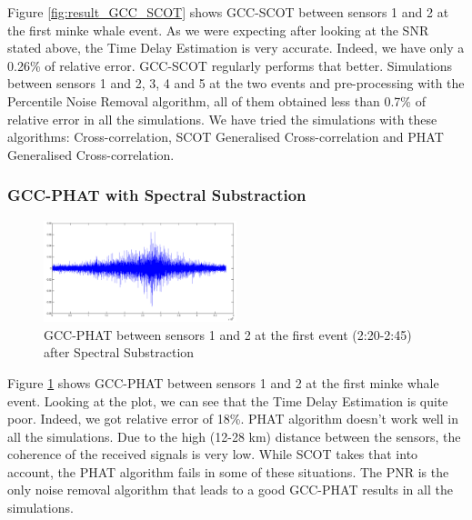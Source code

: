       Figure \ref{fig:result_GCC_SCOT} shows GCC-SCOT between sensors 1 and 2 at the first minke whale event. As we were expecting after looking at the SNR stated above, the Time Delay Estimation is very accurate. Indeed, we have only a 0.26\% of relative error. GCC-SCOT regularly performs that better. Simulations between sensors 1 and 2, 3, 4 and 5 at the two events and pre-processing with the Percentile Noise Removal algorithm, all of them obtained less than 0.7\% of relative error in all the simulations. We have tried the simulations with these algorithms: Cross-correlation, SCOT Generalised Cross-correlation and PHAT Generalised Cross-correlation.
  
    \subsubsection{GCC-PHAT with Spectral Substraction}
    
    \begin{figure}[htb]
      \begin{center}
	      \includegraphics[width=0.5\textwidth]{figures/6gcc_Phat_SS_12_1.png}
      \end{center}
      \caption{GCC-PHAT between sensors 1 and 2 at the first event (2:20-2:45) after Spectral Substraction}
      \label{fig:result_GCC_PHAT}
    \end{figure}
      
    Figure \ref{fig:result_GCC_PHAT} shows GCC-PHAT between sensors 1 and 2 at the first minke whale event. Looking at the plot, we can see that the Time Delay Estimation is quite poor. Indeed, we got relative error of 18\%. PHAT algorithm doesn't work well in all the simulations. Due to the high (12-28 km) distance between the sensors, the coherence of the received signals is very low. While SCOT takes that into account, the PHAT algorithm fails in some of these situations. The PNR is the only noise removal algorithm that leads to a good GCC-PHAT results in all the simulations.
